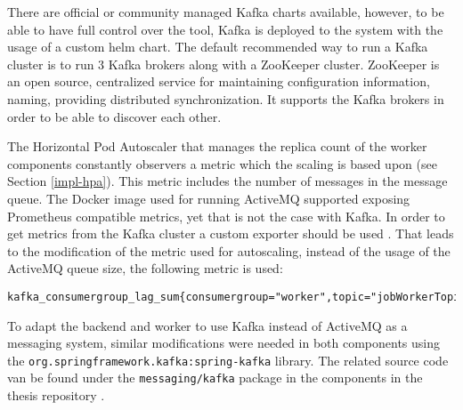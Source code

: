 
There are official or community managed Kafka charts available, however, to be able to have full control over the tool, Kafka is deployed to the system with the usage of a custom helm chart. The default recommended way to run a Kafka cluster is to run 3 Kafka brokers along with a ZooKeeper cluster. ZooKeeper \cite{ZooKeeper} is an open source, centralized service for maintaining configuration information, naming, providing distributed synchronization. It supports the Kafka brokers in order to be able to discover each other.

The Horizontal Pod Autoscaler that manages the replica count of the worker components constantly observers a metric which the scaling is based upon (see Section \ref{impl-hpa}). This metric includes the number of messages in the message queue. The Docker image used for running ActiveMQ supported exposing Prometheus compatible metrics, yet that is not the case with Kafka. In order to get metrics from the Kafka cluster a custom exporter should be used \cite{KafkaExporter}. That leads to the modification of the metric used for autoscaling, instead of the usage of the ActiveMQ queue size, the following metric is used:


\vspace{0.5cm}
\begin{minipage}{\linewidth}
	\begin{lstlisting}[caption={Metric for the number of unconsumed messages in Kafka}, label={lst:kafka-consumerlag-metric}]
	kafka_consumergroup_lag_sum{consumergroup="worker",topic="jobWorkerTopic"}\end{lstlisting}
\end{minipage}

To adapt the backend and worker to use Kafka instead of ActiveMQ as a messaging system, similar modifications were needed in both components using the \texttt{org.springframework.kafka:spring-kafka} library. The related source code van be found under the \texttt{messaging/kafka} package in the components in the thesis repository \cite{ThesisRepo}.

